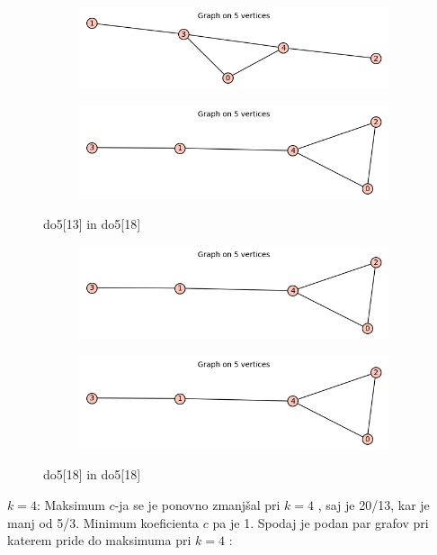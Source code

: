 \documentclass[12pt, a4paper]{article}
\begin{document}
\begin{center}
\begin{figure}[!htb]
\centering
\begin{subfigure}{0.5\textwidth}
  \centering
  \includegraphics[width=0.8\linewidth]{do5[13]}
\end{subfigure}%
\begin{subfigure}{0.5\textwidth}
  \centering
  \includegraphics[width=0.8\linewidth]{do5[18]}
\end{subfigure}
\caption{do5[13] in do5[18]}
\label{fig:test}
\end{figure}

\begin{figure}[!htb]
\centering
\begin{subfigure}{0.5\textwidth}
  \centering
  \includegraphics[width=0.8\linewidth]{do5[18]}
\end{subfigure}%
\begin{subfigure}{0.5\textwidth}
  \centering
  \includegraphics[width=0.8\linewidth]{do5[18]}
\end{subfigure}
\caption{do5[18] in do5[18]}
\label{fig:test}
\end{figure}

\end{center}
$k=4$: Maksimum $c$-ja se je ponovno zmanjšal pri $k=4$ , saj je 20/13, kar je manj od 5/3. Minimum koeficienta $c$ pa je 1. Spodaj je podan par grafov pri katerem pride do maksimuma pri $k=4$ :
\end{document}
